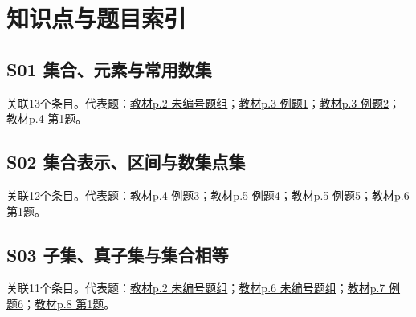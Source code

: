 









\clearpage\section{知识点与题目索引}
\par\medskip\noindent\begin{minipage}{\linewidth}\subsection{S01 集合、元素与常用数集}关联13个条目。代表题：\hyperref[XJ-B1-C01-TH-P002-Y0577]{教材p.2 未编号题组}；\hyperref[XJ-B1-C01-EX-P003-Y0620]{教材p.3 例题1}；\hyperref[XJ-B1-C01-EX-P003-Y1223]{教材p.3 例题2}；\hyperref[XJ-B1-C01-PR-P004-Y0218]{教材p.4 第1题}。\end{minipage}\par
\par\medskip\noindent\begin{minipage}{\linewidth}\subsection{S02 集合表示、区间与数集点集}关联12个条目。代表题：\hyperref[XJ-B1-C01-EX-P004-Y1108]{教材p.4 例题3}；\hyperref[XJ-B1-C01-EX-P005-Y0448]{教材p.5 例题4}；\hyperref[XJ-B1-C01-EX-P005-Y1339]{教材p.5 例题5}；\hyperref[XJ-B1-C01-PR-P006-Y0217]{教材p.6 第1题}。\end{minipage}\par
\par\medskip\noindent\begin{minipage}{\linewidth}\subsection{S03 子集、真子集与集合相等}关联11个条目。代表题：\hyperref[XJ-B1-C01-TH-P002-Y0577]{教材p.2 未编号题组}；\hyperref[XJ-B1-C01-TH-P006-Y0849]{教材p.6 未编号题组}；\hyperref[XJ-B1-C01-EX-P007-Y0656]{教材p.7 例题6}；\hyperref[XJ-B1-C01-PR-P008-Y0877]{教材p.8 第1题}。\end{minipage}\par

